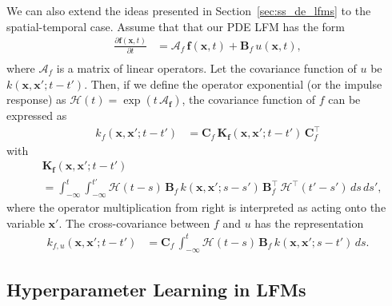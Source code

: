 \documentclass[journal]{IEEEtran}
\begin{document}
We can also extend the ideas presented in Section~\ref{sec:ss_de_lfms} to the spatial-temporal case.  Assume that that our PDE LFM has the form
%
\begin{equation}
\begin{split}
  \frac{\partial \mathbf{f}(\mathbf{x},t)}{\partial t}
  &= \mathbf{\mathcal{A}}_f \, \mathbf{f}(\mathbf{x},t) + \mathbf{B}_f \, u(\mathbf{x},t), \\
\end{split}
\end{equation}
%
where $\mathbf{\mathcal{A}}_f$ is a matrix of linear operators. Let the covariance function of $u$ be $k(\mathbf{x},\mathbf{x}';t - t')$. Then, if we define the operator exponential (or the impulse response) as $\mathbf{\mathcal{H}}(t) = \exp(t \, \mathbf{\mathcal{A}_f})$, the covariance function of $f$ can be expressed as
%
\begin{equation}
\begin{split}
  k_f(\mathbf{x},\mathbf{x}';t-t') &=
  \mathbf{C}_f \, \mathbf{K}_\mathbf{f}(\mathbf{x},\mathbf{x}';t-t') \, \mathbf{C}_f^{\top}
\end{split}
\end{equation}
%
with
%
\begin{equation}
\begin{split}
  &\mathbf{K}_\mathbf{f}(\mathbf{x},\mathbf{x}';t-t')
  \\ &
  =
  \int_{-\infty}^{t} \int_{-\infty}^{t'}
  \mathbf{\mathcal{H}}(t - s) \, \mathbf{B}_f \, k(\mathbf{x},\mathbf{x}';s - s') \,
  \mathbf{B}_f^{\top} \, \mathbf{\mathcal{H}}^{\top}(t' - s') \, ds \, ds',
\end{split}
\label{eq:vfcov_pde}
\end{equation}
%
where the operator multiplication from right is interpreted as acting onto the variable $\mathbf{x}'$. The
cross-covariance between $f$ and $u$ has the representation
%
\begin{equation}
\begin{split}
  k_{f,u}(\mathbf{x},\mathbf{x}';t-t') &=
  \mathbf{C}_f \, 
  \int_{-\infty}^{t}
  \mathbf{\mathcal{H}}(t - s) \, \mathbf{B}_f \, k(\mathbf{x},\mathbf{x}';s - t') \, ds.
\end{split}
\end{equation}

\subsection{Hyperparameter Learning in LFMs}
\end{document}
